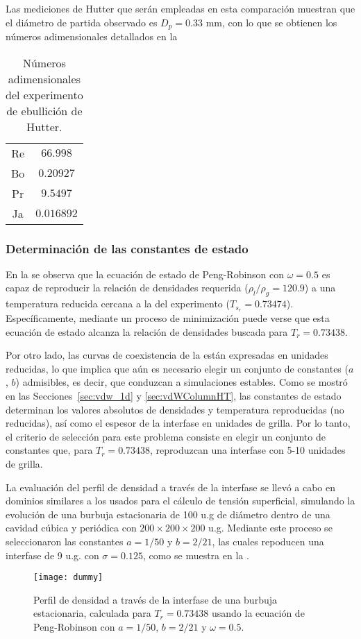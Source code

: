 Las mediciones de Hutter que ser\'an empleadas en esta comparaci\'on muestran que el di\'ametro de partida observado es $D_p=0.33$ mm, con lo que se obtienen los n\'umeros adimensionales detallados en la 
\begin{table}[ht]
	\centering
    \begin{tabular}{c c}
	    \toprule
		Re & $66.998$  \\
		Bo & $0.20927$ \\
		Pr & $9.5497$ \\
		Ja & $0.016892$ \\
        \bottomrule
	\end{tabular}
	\caption{N\'umeros adimensionales del experimento de ebullici\'on de Hutter.}
	\label{tab:exp_adim}
\end{table} 



\subsubsection{Determinaci\'on de las constantes de estado}

En la  se observa que la ecuaci\'on de estado de Peng-Robinson con $\omega=0.5$ es capaz de reproducir la relaci\'on de densidades requerida ($\rho_l/\rho_g = 120.9$) a una temperatura reducida cercana a la del experimento ($T_{s_r}=0.73474$). Espec\'ificamente, mediante un proceso de minimizaci\'on puede verse que esta ecuaci\'on de estado alcanza la relaci\'on de densidades buscada para $T_r=0.73438$.

Por otro lado, las curvas de coexistencia de la  est\'an expresadas en unidades reducidas, lo que implica que a\'un es necesario elegir un conjunto de constantes ($a$, $b$) admisibles, es decir, que conduzcan a simulaciones estables. Como se mostr\'o en las Secciones~\ref{sec:vdw_1d} y \ref{sec:vdWColumnHT}, las constantes de estado determinan los valores absolutos de densidades y temperatura reproducidas (no reducidas), as\'i como el espesor de la interfase en unidades de grilla. Por lo tanto, el criterio de selecci\'on para este problema consiste en elegir  un conjunto de constantes que, para $T_r=0.73438$, reproduzcan una interfase con 5-10 unidades de grilla.

La evaluaci\'on del perfil de densidad a trav\'es de la interfase se llev\'o a cabo en dominios similares a los usados para el c\'alculo de tensi\'on superficial, simulando la evoluci\'on de una burbuja estacionaria de 100 u.g de di\'ametro dentro de una cavidad c\'ubica y peri\'odica con $200 \times 200 \times 200$ u.g. Mediante este proceso se seleccionaron las constantes $a=1/50$ y $b=2/21$, las cuales repoducen una interfase de 9 u.g. con $\sigma=0.125$, como se muestra en la .
\begin{figure}[ht]
	\centering
	\texttt{[image: dummy]}
	\caption{Perfil de densidad a trav\'es de la interfase de una burbuja estacionaria, calculada para $T_r=0.73438$ usando la ecuaci\'on de Peng-Robinson con $a=1/50$, $b=2/21$ y $\omega=0.5$.}
	\label{fig:rho_int_bubble}
\end{figure}



